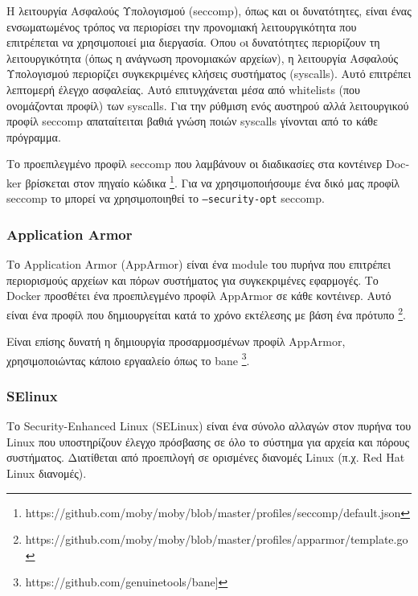 Η λειτουργία Ασφαλούς Υπολογισμού (\textlatin{seccomp}), όπως και οι
δυνατότητες, είναι ένας ενσωματωμένος τρόπος να περιορίσει την προνομιακή
λειτουργικότητα που επιτρέπεται να χρησιμοποιεί μια διεργασία. Οπου
oι δυνατότητες περιορίζουν τη λειτουργικότητα (όπως η ανάγνωση προνομιακών
αρχείων), η λειτουργία Ασφαλούς Υπολογισμού περιορίζει συγκεκριμένες κλήσεις
συστήματος (\textlatin{syscalls}). Αυτό επιτρέπει λεπτομερή έλεγχο ασφαλείας.
Αυτό επιτυγχάνεται μέσα από \textlatin{whitelists} (που ονομάζονται προφίλ)
των \textlatin{syscalls}. Για την ρύθμιση ενός αυστηρού αλλά λειτουργικού
προφίλ \textlatin{seccomp} απαταίτειται βαθιά γνώση ποιών \textlatin{syscalls}
γίνονται από το κάθε πρόγραμμα.

Το προεπιλεγμένο προφίλ \textlatin{seccomp} που λαμβάνουν οι διαδικασίες στα
κοντέινερ \textlatin{Docker} βρίσκεται στον πηγαίο κώδικα
\footnote{\textlatin{https://github.com/moby/moby/blob/master/profiles/seccomp/default.json}}.
Για να χρησιμοποιήσουμε ένα δικό μας προφίλ \textlatin{seccomp} το μπορεί να
χρησιμοποιηθεί το \texttt{\textlatin{--security-opt}} \textlatin{seccomp}.

\subsubsection{\textlatin{Application Armor}}

Το \textlatin{Application Armor (AppArmor)} είναι ένα \textlatin{module} του
πυρήνα που επιτρέπει περιορισμούς αρχείων και πόρων συστήματος για
συγκεκριμένες εφαρμογές. Το Docker προσθέτει ένα προεπιλεγμένο προφίλ
\textlatin{AppArmor} σε κάθε κοντέινερ. Αυτό είναι ένα
προφίλ που δημιουργείται κατά το χρόνο εκτέλεσης με βάση ένα πρότυπο
\footnote{\textlatin{https://github.com/moby/moby/blob/master/profiles/apparmor/template.go}}.

Είναι επίσης δυνατή η δημιουργία προσαρμοσμένων προφίλ \textlatin{AppArmor}, 
χρησιμοποιώντας κάποιο εργααλείο όπως το bane
\footnote{\textlatin{https://github.com/genuinetools/bane]}}.

\subsubsection{\textlatin{SElinux}}

Το \textlatin{Security-Enhanced Linux (SELinux)} είναι ένα σύνολο αλλαγών στον
πυρήνα του \textlatin{Linux} που υποστηρίζουν έλεγχο πρόσβασης σε όλο το
σύστημα για αρχεία και πόρους συστήματος. Διατίθεται από προεπιλογή σε
ορισμένες διανομές \textlatin{Linux} (π.χ. \textlatin{Red Hat Linux} διανομές).

